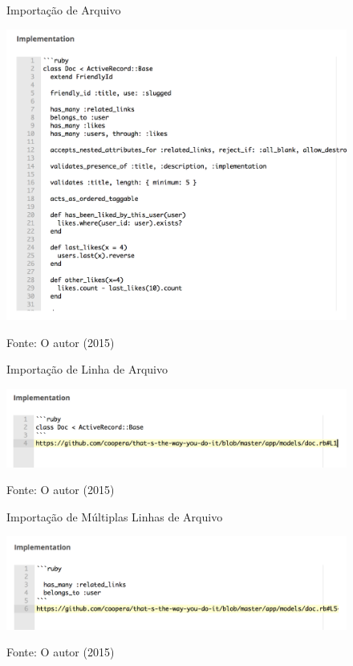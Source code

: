\begin{figure}[hb]
	\centering
    \caption{Importação de Arquivo}
    \includegraphics[width=13cm]{Imagens/import-file.png}
		\label{fig:doc-import-1}
	\caption*{Fonte: O autor (2015)}
\end{figure}

\begin{figure}[ht]
	\centering
    \caption{Importação de Linha de Arquivo}
    \includegraphics[width=15cm]{Imagens/import-line.png}
		\label{fig:doc-import-2}
	\caption*{Fonte: O autor (2015)}
\end{figure}

\begin{figure}[ht]
	\centering
    \caption{Importação de Múltiplas Linhas de Arquivo}
    \includegraphics[width=13cm]{Imagens/import-lines.png}
		\label{fig:doc-import-3}
	\caption*{Fonte: O autor (2015)}
\end{figure}

